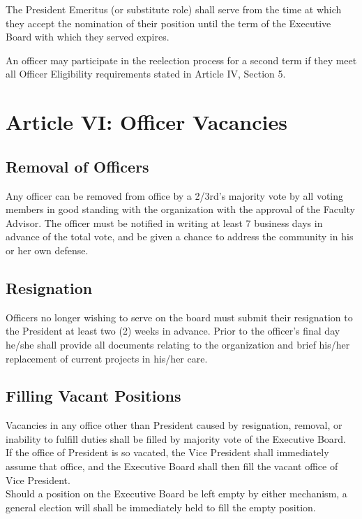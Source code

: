 \documentclass{article}
\begin{document}
The President Emeritus (or substitute role) shall serve from the time at
which they accept the nomination of their position until the term of the
Executive Board with which they served expires.

An officer may participate in the reelection process for a second term
if they meet all Officer Eligibility requirements stated in Article IV,
Section 5.


\section{Article VI: Officer Vacancies}

\subsection{Removal of Officers}

Any officer can be removed from office by a 2/3rd's majority vote by all
voting members in good standing with the organization with the approval
of the Faculty Advisor. The officer must be notified in writing at least
7 business days in advance of the total vote, and be given a chance to
address the community in his or her own defense.

\subsection{Resignation}

Officers no longer wishing to serve on the board must submit their
resignation to the President at least two (2) weeks in advance. Prior to
the officer's final day he/she shall provide all documents relating to
the organization and brief his/her replacement of current projects in
his/her care.

\subsection{Filling Vacant Positions}

Vacancies in any office other than President caused by resignation,
removal, or inability to fulfill duties shall be filled by majority vote
of the Executive Board.\\

If the office of President is so vacated, the Vice President shall
immediately assume that office, and the Executive Board shall then fill
the vacant office of Vice President.\\

Should a position on the Executive Board be left empty by either
mechanism, a general election will shall be immediately held to fill the
empty position.
\end{document}
